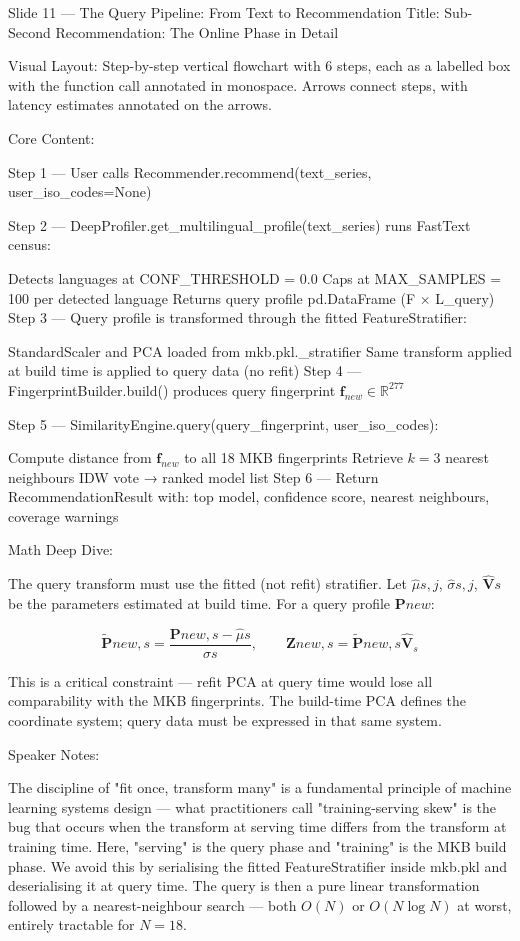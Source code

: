 Slide 11 — The Query Pipeline: From Text to Recommendation
Title: Sub-Second Recommendation: The Online Phase in Detail

Visual Layout: Step-by-step vertical flowchart with 6 steps, each as a labelled box with the function call annotated in monospace. Arrows connect steps, with latency estimates annotated on the arrows.

Core Content:

Step 1 — User calls Recommender.recommend(text_series, user_iso_codes=None)

Step 2 — DeepProfiler.get_multilingual_profile(text_series) runs FastText census:

Detects languages at CONF_THRESHOLD = 0.0
Caps at MAX_SAMPLES = 100 per detected language
Returns query profile pd.DataFrame (F × L_query)
Step 3 — Query profile is transformed through the fitted FeatureStratifier:

StandardScaler and PCA loaded from mkb.pkl._stratifier
Same transform applied at build time is applied to query data (no refit)
Step 4 — FingerprintBuilder.build() produces query fingerprint $\mathbf{f}_{new} \in \mathbb{R}^{277}$

Step 5 — SimilarityEngine.query(query_fingerprint, user_iso_codes):

Compute distance from $\mathbf{f}_{new}$ to all 18 MKB fingerprints
Retrieve $k=3$ nearest neighbours
IDW vote → ranked model list
Step 6 — Return RecommendationResult with: top model, confidence score, nearest neighbours, coverage warnings

Math Deep Dive:

The query transform must use the fitted (not refit) stratifier. Let $\hat{\mu}{s,j}$, $\hat{\sigma}{s,j}$, $\hat{\mathbf{V}}s$ be the parameters estimated at build time. For a query profile $\mathbf{P}{new}$:

$$\tilde{\mathbf{P}}{new,s} = \frac{\mathbf{P}{new,s} - \hat{\mu}s}{\hat{\sigma}s}, \qquad \mathbf{Z}{new,s} = \tilde{\mathbf{P}}{new,s} \hat{\mathbf{V}}_s$$

This is a critical constraint — refit PCA at query time would lose all comparability with the MKB fingerprints. The build-time PCA defines the coordinate system; query data must be expressed in that same system.

Speaker Notes:

The discipline of "fit once, transform many" is a fundamental principle of machine learning systems design — what practitioners call "training-serving skew" is the bug that occurs when the transform at serving time differs from the transform at training time. Here, "serving" is the query phase and "training" is the MKB build phase. We avoid this by serialising the fitted FeatureStratifier inside mkb.pkl and deserialising it at query time. The query is then a pure linear transformation followed by a nearest-neighbour search — both $O(N)$ or $O(N \log N)$ at worst, entirely tractable for $N=18$.

